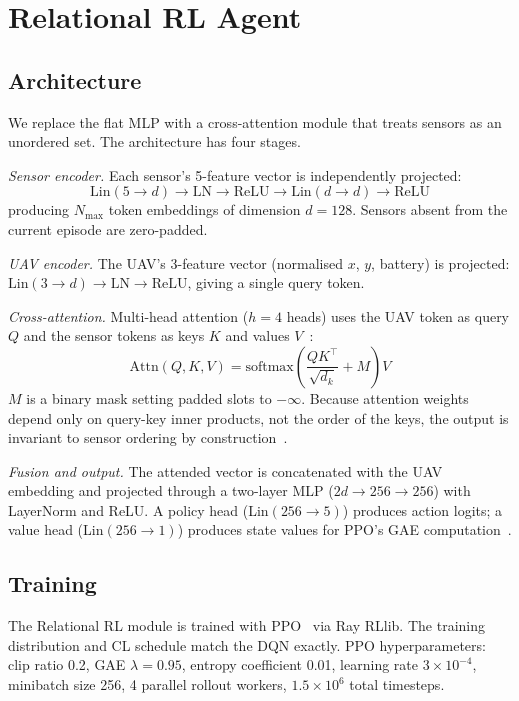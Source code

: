 \documentclass[conference]{IEEEtran}
\begin{document}
\section{Relational RL Agent}

\subsection{Architecture}

We replace the flat MLP with a cross-attention module that treats sensors as an unordered set. The architecture has four stages.

\textit{Sensor encoder.} Each sensor's 5-feature vector is independently projected:
\[
\text{Lin}(5 \to d) \to \text{LN} \to \text{ReLU} \to \text{Lin}(d \to d) \to \text{ReLU}
\]
producing $N_{\max}$ token embeddings of dimension $d{=}128$. Sensors absent from the current episode are zero-padded.

\textit{UAV encoder.} The UAV's 3-feature vector (normalised $x$, $y$, battery) is projected:
$\text{Lin}(3 \to d) \to \text{LN} \to \text{ReLU}$, giving a single query token.

\textit{Cross-attention.} Multi-head attention ($h{=}4$ heads) uses the UAV token as query $Q$ and the sensor tokens as keys $K$ and values $V$~\cite{vaswani2017attention}:
\begin{equation}
\text{Attn}(Q,K,V) = \text{softmax}\!\left(\frac{QK^\top}{\sqrt{d_k}} + M\right)V
\label{eq:attn}
\end{equation}
$M$ is a binary mask setting padded slots to $-\infty$. Because attention weights depend only on query-key inner products, not the order of the keys, the output is invariant to sensor ordering by construction~\cite{zambaldi2018relational,zaheer2017deepsets}.

\textit{Fusion and output.} The attended vector is concatenated with the UAV embedding and projected through a two-layer MLP ($2d \to 256 \to 256$) with LayerNorm and ReLU. A policy head (Lin$(256 \to 5)$) produces action logits; a value head (Lin$(256 \to 1)$) produces state values for PPO's GAE computation~\cite{schulman2016gae}.

\subsection{Training}

The Relational RL module is trained with PPO~\cite{schulman2017proximal} via Ray RLlib. The training distribution and CL schedule match the DQN exactly. PPO hyperparameters: clip ratio 0.2, GAE $\lambda{=}0.95$, entropy coefficient 0.01, learning rate $3{\times}10^{-4}$, minibatch size 256, 4 parallel rollout workers, $1.5{\times}10^6$ total timesteps.
\end{document}
